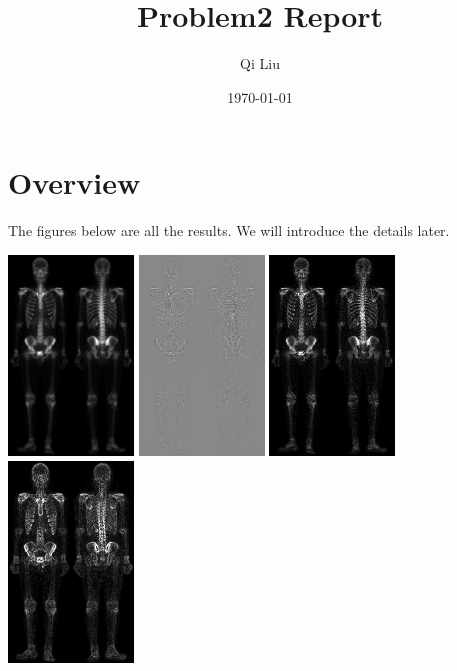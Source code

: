 \documentclass{article}
\title{Problem2 Report}
\author{Qi Liu}
\date{\today}
\begin{document}
\maketitle

\section{Overview}
The figures below are all the results. We will introduce the details later.

\includegraphics[width=0.25\textwidth]{../data/skeleton_orig.jpg}
\includegraphics[width=0.25\textwidth]{../data/laplace_skeleton_orig.jpg}
\includegraphics[width=0.25\textwidth]{../data/laplacian_skeleton_orig.jpg}
\includegraphics[width=0.25\textwidth]{../data/sobel_skeleton_orig.jpg}
\end{document}
